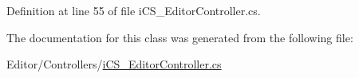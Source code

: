 Definition at line 55 of file i\+C\+S\+\_\+\+Editor\+Controller.\+cs.



The documentation for this class was generated from the following file\+:\begin{DoxyCompactItemize}
\item 
Editor/\+Controllers/\hyperlink{i_c_s___editor_controller_8cs}{i\+C\+S\+\_\+\+Editor\+Controller.\+cs}\end{DoxyCompactItemize}
